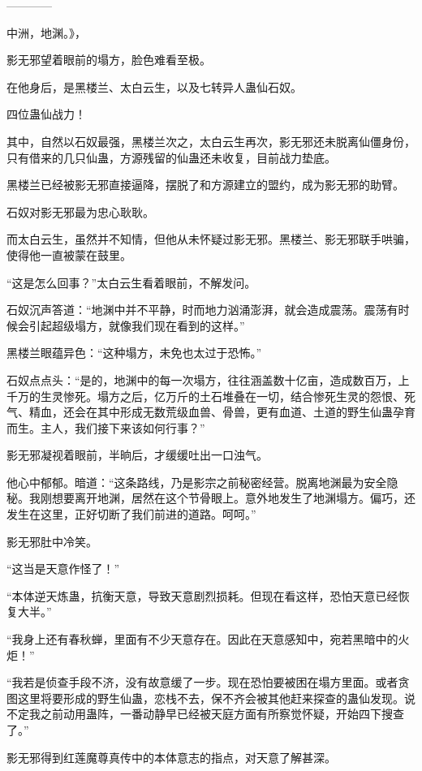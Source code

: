 
\begin{this_body}

------------

中洲，地渊。》，

影无邪望着眼前的塌方，脸色难看至极。

在他身后，是黑楼兰、太白云生，以及七转异人蛊仙石奴。

四位蛊仙战力！

其中，自然以石奴最强，黑楼兰次之，太白云生再次，影无邪还未脱离仙僵身份，只有借来的几只仙蛊，方源残留的仙蛊还未收复，目前战力垫底。

黑楼兰已经被影无邪直接逼降，摆脱了和方源建立的盟约，成为影无邪的助臂。

石奴对影无邪最为忠心耿耿。

而太白云生，虽然并不知情，但他从未怀疑过影无邪。黑楼兰、影无邪联手哄骗，使得他一直被蒙在鼓里。

“这是怎么回事？”太白云生看着眼前，不解发问。

石奴沉声答道：“地渊中并不平静，时而地力汹涌澎湃，就会造成震荡。震荡有时候会引起超级塌方，就像我们现在看到的这样。”

黑楼兰眼蕴异色：“这种塌方，未免也太过于恐怖。”

石奴点点头：“是的，地渊中的每一次塌方，往往涵盖数十亿亩，造成数百万，上千万的生灵惨死。塌方之后，亿万斤的土石堆叠在一切，结合惨死生灵的怨恨、死气、精血，还会在其中形成无数荒级血兽、骨兽，更有血道、土道的野生仙蛊孕育而生。主人，我们接下来该如何行事？”

影无邪凝视着眼前，半晌后，才缓缓吐出一口浊气。

他心中郁郁。暗道：“这条路线，乃是影宗之前秘密经营。脱离地渊最为安全隐秘。我刚想要离开地渊，居然在这个节骨眼上。意外地发生了地渊塌方。偏巧，还发生在这里，正好切断了我们前进的道路。呵呵。”

影无邪肚中冷笑。

“这当是天意作怪了！”

“本体逆天炼蛊，抗衡天意，导致天意剧烈损耗。但现在看这样，恐怕天意已经恢复大半。”

“我身上还有春秋蝉，里面有不少天意存在。因此在天意感知中，宛若黑暗中的火炬！”

“我若是侦查手段不济，没有故意缓了一步。现在恐怕要被困在塌方里面。或者贪图这里将要形成的野生仙蛊，恋栈不去，保不齐会被其他赶来探查的蛊仙发现。说不定我之前动用蛊阵，一番动静早已经被天庭方面有所察觉怀疑，开始四下搜查了。”

影无邪得到红莲魔尊真传中的本体意志的指点，对天意了解甚深。


\end{this_body}
